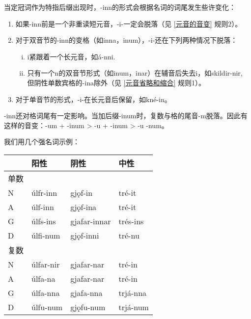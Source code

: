 当定冠词作为特指后缀出现时，-inn的形式会根据名词的词尾发生些许变化：

\begin{info}
    \begin{enumerate}[1)]
        \item  如果-inn前是一个非重读短元音，-i-一定会脱落（见 \ref{元音的音变} 规则2）。
        \item  对于双音节的-inn的变格（如inna，inum），-i-还在下列两种情况下脱落：  
        \begin{enumerate}[i.]
            \item  i紧跟着一个长元音，如á-nni.  
            \item  只有一个n的双音节形式（如inum，inar）在辅音后失去i，如skildir-nir,    但阴性单数宾格的-ina除外（见 \ref{元音省略和缩合} 规则1）。  
        \end{enumerate}
        \item  对于单音节的形式，-i-在长元音后保留，如kné-in。
    \end{enumerate}
\end{info}

-inn还对格词尾有一定影响。当加后缀-inum时，复数与格的尾音-m脱落。因此有这样的音变：-um
+ -inum \textgreater{} -u + -inum \textgreater{} -u -num。

我们用几个强名词示例：

\begin{longtable}{llll}
  \toprule
       & \textbf{阳性}      & \textbf{阴性}         & \textbf{中性}     \\
  \midrule
  \endhead
  \bottomrule
  \endfoot
  单数 &           &              &          \\
  N    & úlfr-inn  & gjǫf-in      & tré-it   \\
  A    & úlf-inn   & gjǫf-ina     & tré-it   \\
  G    & úlfs-ins  & gjafar-innar & trés-ins \\
  D    & úlfi-num  & gjǫf-inni    & tré-nu   \\
  复数 &           &              &          \\
  N    & úlfar-nir & gjafar-nar   & tré-in   \\
  A    & úlfa-na   & gjafar-nar   & tré-in   \\
  G    & úlfa-nna  & gjafa-nna    & trjá-nna \\
  D    & úlfu-num  & gjǫfu-num    & trjá-num \\
\end{longtable}

